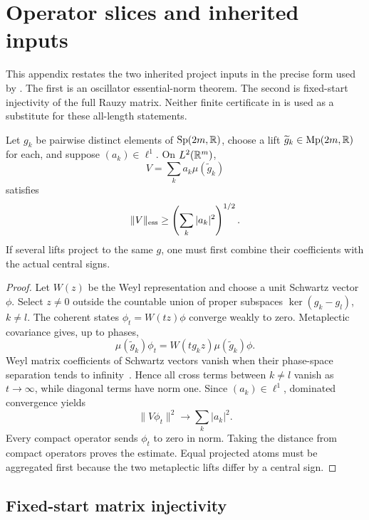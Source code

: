 \section{Operator slices and inherited inputs}
\label{app:operator-proofs}

This appendix restates the two inherited project inputs in the precise form
used by .  The first is an oscillator
essential-norm theorem.  The second is fixed-start injectivity of the full
Rauzy matrix.  Neither finite certificate in  is used
as a substitute for these all-length statements.

\begin{lemma}
\label{lem:discrete-atoms}
Let \(g_k\) be pairwise distinct elements of \(\operatorname{Sp}(2m,\mathbb{R})\), choose a lift
\(\widetilde g_k\in\operatorname{Mp}(2m,\mathbb{R})\) for each, and suppose
\((a_k)\in\ell^1\).  On \(L^2(\mathbb{R}^m)\),
\[
 V=\sum_ka_k\mu(\widetilde g_k)
\]
satisfies
\[
 \|V\|_{\mathrm{ess}}\geq\left(\sum_k|a_k|^2\right)^{1/2}.
\]
If several lifts project to the same \(g\), one must first combine their
coefficients with the actual central signs.
\end{lemma}

\begin{proof}
Let \(W(z)\) be the Weyl representation and choose a unit Schwartz vector
\(\phi\).  Select \(z\neq0\) outside the countable union of proper subspaces
\(\ker(g_k-g_l)\), \(k\neq l\).  The coherent states
\(\phi_t=W(tz)\phi\) converge weakly to zero.  Metaplectic covariance gives,
up to phases,
\[
 \mu(\widetilde g_k)\phi_t
 =W(tg_kz)\mu(\widetilde g_k)\phi.
\]
Weyl matrix coefficients of Schwartz vectors vanish when their phase-space
separation tends to infinity~\citep{folland1989}.  Hence all cross terms
between \(k\neq l\) vanish as \(t\to\infty\), while diagonal terms have
norm one.  Since \((a_k)\in\ell^1\), dominated convergence yields
\[
 \|V\phi_t\|^2\longrightarrow\sum_k|a_k|^2.
\]
Every compact operator sends \(\phi_t\) to zero in norm.  Taking the
distance from compact operators proves the estimate.  Equal projected atoms
must be aggregated first because the two metaplectic lifts differ by a
central sign.
\end{proof}

\subsection{Fixed-start matrix injectivity}

